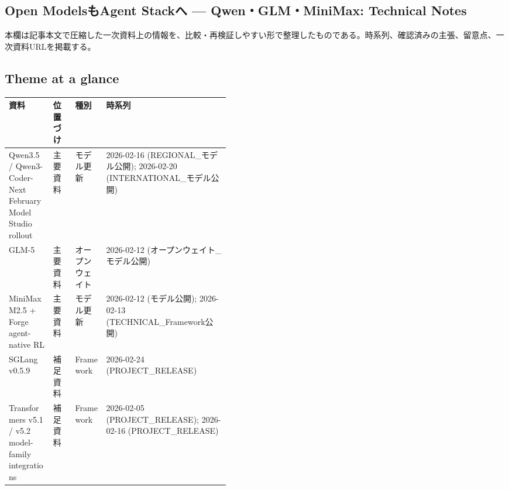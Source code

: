 \subsection*{Open ModelsもAgent Stackへ — Qwen・GLM・MiniMax: Technical Notes}
本欄は記事本文で圧縮した一次資料上の情報を、比較・再検証しやすい形で整理したものである。時系列、確認済みの主張、留意点、一次資料URLを掲載する。
\medskip
\subsection*{Theme at a glance}
\begin{center}
\footnotesize
\begin{tabularx}{\linewidth}{@{}p{0.20\linewidth}p{0.10\linewidth}p{0.14\linewidth}X@{}}
\toprule
資料 & 位置づけ & 種別 & 時系列 \\
\midrule
Qwen3.5 / Qwen3-Coder-Next February Model Studio rollout & 主要資料 & モデル更新 & 2026-02-16 (REGIONAL\_モデル公開); 2026-02-20 (INTERNATIONAL\_モデル公開) \\
GLM-5 & 主要資料 & オープンウェイト & 2026-02-12 (オープンウェイト\_モデル公開) \\
MiniMax M2.5 + Forge agent-native RL & 主要資料 & モデル更新 & 2026-02-12 (モデル公開); 2026-02-13 (TECHNICAL\_Framework公開) \\
SGLang v0.5.9 & 補足資料 & Framework & 2026-02-24 (PROJECT\_RELEASE) \\
Transformers v5.1 / v5.2 model-family integrations & 補足資料 & Framework & 2026-02-05 (PROJECT\_RELEASE); 2026-02-16 (PROJECT\_RELEASE) \\
\bottomrule
\end{tabularx}
\end{center}
\normalsize

